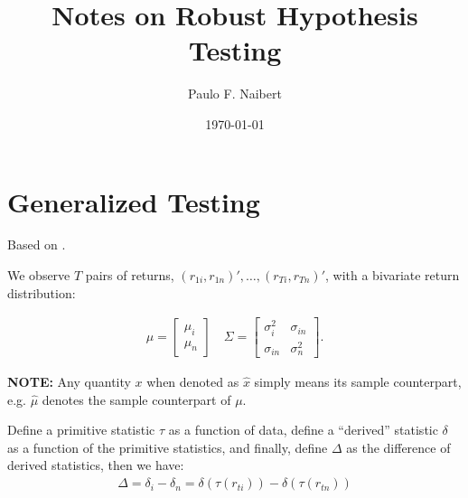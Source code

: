 \documentclass[12pt,oneside,a4paper]{article}
\begin{document}
\title{Notes on Robust Hypothesis Testing}
\author{Paulo F. Naibert}
\date{\today}

\maketitle

\thispagestyle{headings}
\section{Generalized Testing}
Based on \cite{lw2008-sr, lw2011-var}.

We observe $T$ pairs of returns, $(r_{1i}, r_{1n})', \dots, (r_{Ti}, r_{Tn})'$, with a bivariate return distribution:
% 

\begin{align*}
\mu=
\begin{bmatrix}
\mu_{i} \\ \mu_{n}
\end{bmatrix}
\quad
\Sigma=
\begin{bmatrix}
\sigma_{i}^2 & \sigma_{in}
\\
\sigma_{in} & \sigma_{n}^2
\end{bmatrix}.
\end{align*}

\textbf{NOTE:} Any quantity $x$ when denoted as $\hat{x}$ simply means its sample counterpart, e.g. $\hat{\mu}$ denotes the sample counterpart of $\mu$.

Define a primitive statistic $\tau$ as a function of data, define a ``derived'' statistic $\delta$ as a function of the primitive statistics, and finally, define $\Delta$ as the difference of derived statistics, then we have:
\begin{align*}
	\Delta = \delta_{i} - \delta_{n} = \delta(\tau(r_{ti})) - \delta(\tau(r_{tn}))
\end{align*}
\end{document}
